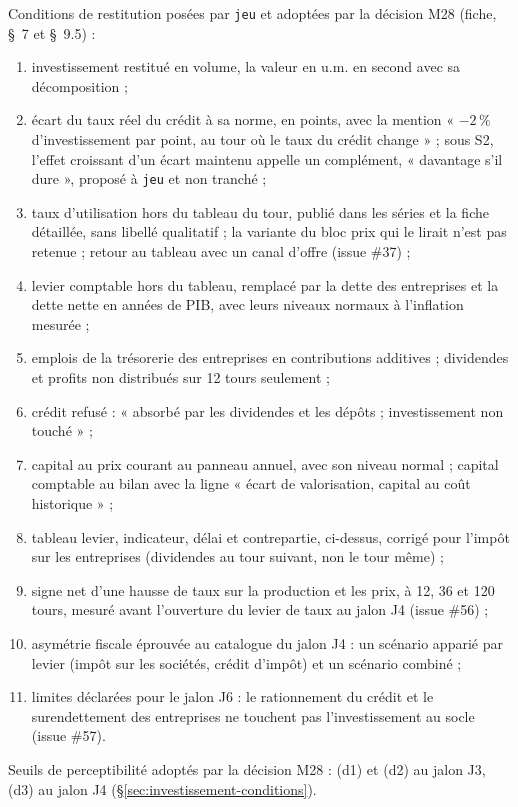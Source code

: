 \documentclass[11pt,a4paper]{article}
\begin{document}
\begin{joueur}
\begin{itemize}
\end{itemize}
Conditions de restitution posées par \texttt{jeu} et adoptées par la décision M28 (fiche, \S~7 et \S~9.5) :
\begin{enumerate}
\item investissement restitué en volume, la valeur en u.m. en second avec sa décomposition ;
\item écart du taux réel du crédit à sa norme, en points, avec la mention « $-2\,\%$ d'investissement par point, au tour où le taux du crédit change » ; sous S2, l'effet croissant d'un écart maintenu appelle un complément, « davantage s'il dure », proposé à \texttt{jeu} et non tranché ;
\item taux d'utilisation hors du tableau du tour, publié dans les séries et la fiche détaillée, sans libellé qualitatif ; la variante du bloc prix qui le lirait n'est pas retenue ; retour au tableau avec un canal d'offre (issue \#37) ;
\item levier comptable hors du tableau, remplacé par la dette des entreprises et la dette nette en années de PIB, avec leurs niveaux normaux à l'inflation mesurée ;
\item emplois de la trésorerie des entreprises en contributions additives ; dividendes et profits non distribués sur 12 tours seulement ;
\item crédit refusé : « absorbé par les dividendes et les dépôts ; investissement non touché » ;
\item capital au prix courant au panneau annuel, avec son niveau normal ; capital comptable au bilan avec la ligne « écart de valorisation, capital au coût historique » ;
\item tableau levier, indicateur, délai et contrepartie, ci-dessus, corrigé pour l'impôt sur les entreprises (dividendes au tour suivant, non le tour même) ;
\item signe net d'une hausse de taux sur la production et les prix, à 12, 36 et 120 tours, mesuré avant l'ouverture du levier de taux au jalon J4 (issue \#56) ;
\item asymétrie fiscale éprouvée au catalogue du jalon J4 : un scénario apparié par levier (impôt sur les sociétés, crédit d'impôt) et un scénario combiné ;
\item limites déclarées pour le jalon J6 : le rationnement du crédit et le surendettement des entreprises ne touchent pas l'investissement au socle (issue \#57).
\end{enumerate}
Seuils de perceptibilité adoptés par la décision M28 : (d1) et (d2) au jalon J3, (d3) au jalon J4 (\S\ref{sec:investissement-conditions}).
\end{joueur}
\end{document}
